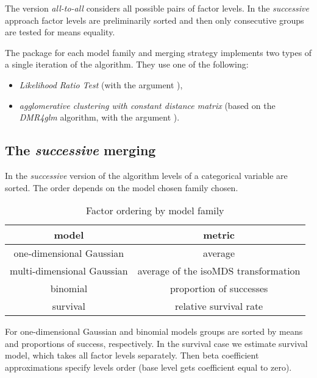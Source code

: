 The version \emph{all-to-all} considers all possible pairs of factor levels. In the \emph{successive} approach factor levels are preliminarily sorted and then only consecutive groups are tested for means equality.

The \factorMerger package for each model family and merging strategy implements two types of a single iteration of the algorithm. They use one of the following:

\begin{itemize}

\item \emph{Likelihood Ratio Test} (with the argument ),
\item \emph{agglomerative clustering with constant distance matrix} (based on the \emph{DMR4glm} algorithm, with the argument ). 

\end{itemize}


\subsection{The \emph{successive} merging}

In the \emph{successive} version of the algorithm levels of a categorical variable are sorted. The order depends on the model chosen family chosen. 

\begin{table}[H]
\centering \begin{tabular}[t]{c|c}
\hline \textbf{model} & \textbf{metric} \\
\hline one-dimensional Gaussian & average \\
\hline multi-dimensional Gaussian & average of the isoMDS transformation \\
\hline binomial & proportion of successes \\
\hline survival & relative survival rate \\
\hline 

\end{tabular}
\caption{\label{tab:}Factor ordering by model family}

\end{table}

For one-dimensional Gaussian and binomial models groups are sorted by means and proportions of success, respectively. In the survival case we estimate survival model, which takes all factor levels separately. Then beta coefficient approximations specify levels order (base level gets coefficient equal to zero). 

